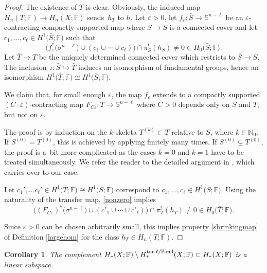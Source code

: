 \documentclass[pdftex]{sigma}
\numberwithin{equation}{section}
\newtheorem{Corollary}[Theorem]{Corollary}
\newcommand{\F}{\mathbb{F}}
\newcommand{\N}{\mathbb{N}}
\newcommand{\SSS}{\mathbb{S}}
\newcommand{\eps}{\varepsilon}
\begin{document}
\begin{proof} The existence of $T$ is clear.
Obviously, the induced map $H_n(T; \F) \to H_n(X; \F)$ sends~$h_T$ to $h$.
Let $\eps > 0$, let $f_{\eps} \colon \bar S \to \SSS^{n-\ell}$ be an $\eps$-contracting compactly supported map where $\bar S \to S$ is a connected cover and let $c_1, \ldots, c_\ell \in H^1\big(\bar S; \F\big)$ such that
\begin{equation} \label{nonzero}
 \big( f_\eps^*\big(\sigma^{n-\ell}\big) \cup (c_1 \cup \cdots \cup c_\ell) \big) \cap \pi_S^!(h_S) \neq 0 \in H_{0}\big(\bar S; \F\big) .
\end{equation}
Let $\bar T \to T$ be the uniquely determined connected cover which restricts to $\bar S \to S$.
The inclusion~${\iota\colon \bar S \hookrightarrow \bar T}$ induces an isomorphism of fundamental groups, hence an isomorphism $H^1\big(\bar T; \F\big) \cong H^1\big(\bar S; \F\big)$.

We claim that, for small enough $\eps$, the map $f_\eps$ extends to a compactly supported $(C \cdot \eps)$-contracting map $F_{C\eps} \colon \bar T \to \SSS^{n-\ell}$ where $C > 0$ depends only on $S$ and $T$, but not on $\eps$.

The proof is by induction on the $k$-skeleta $T^{(k)} \subset T$ relative to $S$, where $k \in \N_0$.
If $S^{(0)} = T^{(0)}$, this is achieved by applying \cite[Lemma 3.2]{BH10} finitely many times.
If $S^{(0)} \subsetneq T^{(0)}$, the proof is a~bit more complicated as the cases $k=0$ and $k=1$ have to be treated simultaneously.
We refer the reader to the detailed argument in \cite[p.\ 474f.]{BH10}, which carries over to our case.

Let $c_1', \ldots c_\ell' \in H^1\big(\bar T; \F\big) \cong H^1\big(\bar S; \F\big)$ correspond to $c_1, \ldots, c_\ell \in H^1\big(\bar S; \F\big)$.
Using the naturality of the transfer map, \eqref{nonzero} implies
\begin{equation*}
 \big( (F_{C \eps})^*\big(\sigma^{n-\ell}\big) \cup (c'_1 \cup \cdots \cup c'_\ell) \big) \cap \pi_T^!(h_T) \neq 0 \in H_0\big(\bar T; \F\big).
\end{equation*}

Since $\eps > 0$ can be chosen arbitrarily small, this implies property \ref{shrinkingmap} of Definition \ref{largehom} for the class $h_T \in H_n(T; \F)$.
\end{proof}

\begin{Corollary} The complement $H_*(X ; \F) \setminus H_*^{\text{\rm tor-}\ell/\F\text{\rm -enl}}(X; \F) \subset H_*(X ; \F)$ is a linear subspace.
\end{Corollary}
\end{document}
